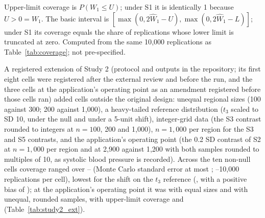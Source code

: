 \documentclass[AMA,Times1COL]{WileyNJDv5}
\begin{document}
\begin{table}[ht]
\centering
\caption{Coverage of the 95\% percentile interval, of its one-sided 97.5\% upper limit, and of the basic (reflected) interval, with mean widths, by scenario and sample size, in the original units of the effect modifier.\label{tab:study2_intervals}}
\begin{tablenotes}
\item Upper-limit coverage is $P(W_1 \leq U)$; under S1 it is identically 1 because $U > 0 = W_1$. The basic interval is $[\max(0, 2\widehat{W}_1 - U), \max(0, 2\widehat{W}_1 - L)]$; under S1 its coverage equals the share of replications whose lower limit is truncated at zero. Computed from the same 10{,}000 replications as Table~\ref{tab:coverage}; not pre-specified.
\end{tablenotes}
\end{table}

A registered extension of Study 2 (protocol and outputs in the repository; its first eight cells were registered after the external review and before the run, and the three cells at the application's operating point as an amendment registered before those cells ran) added cells outside the original design: unequal regional sizes (100 against 300; 200 against 1{,}000), a heavy-tailed reference distribution ($t_3$ scaled to SD 10, under the null and under a 5-unit shift), integer-grid data (the S3 contrast rounded to integers at $n = 100$, 200 and 1{,}000), $n = 1{,}000$ per region for the S3 and S5 contrasts, and the application's operating point (the 0.2 SD contrast of S2 at $n = 1{,}000$ per region and at 2{,}900 against 1{,}200 with both samples rounded to multiples of 10, as systolic blood pressure is recorded). Across the ten non-null cells coverage ranged over -- (Monte Carlo standard error at most ; --10{,}000 replications per cell), lowest for the shift on the $t_3$ reference (, with a positive bias of ); at the application's operating point it was  with equal sizes and  with unequal, rounded samples, with upper-limit coverage  and  (Table~\ref{tab:study2_ext}).
\end{document}
